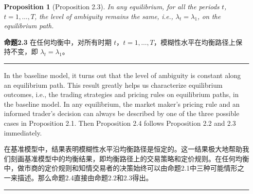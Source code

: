 \documentclass[12pt,a4paper]{article}
\newenvironment{original}{%
  \par\vspace{4pt}\noindent%
  \color{black}%
  \ignorespaces
}{%
  \par\vspace{2pt}%
}
\newenvironment{translation}{%
  \par\vspace{2pt}\noindent%
  \color{transblue}%
  \ignorespaces
}{%
  \par\vspace{4pt}\hrule\vspace{6pt}%
}
\newtheorem{proposition}[theorem]{Proposition}
\begin{document}
\begin{proposition}[Proposition 2.3]
In any equilibrium, for all the periods $t$, $t = 1, \dots, T$, the level of ambiguity remains the same, i.e., $\lambda_t = \lambda_1$, on the equilibrium path.
\end{proposition}
\begin{translation}
\textbf{命题2.3} 在任何均衡中，对所有时期 $t$，$t = 1, \dots, T$，模糊性水平在均衡路径上保持不变，即 $\lambda_t = \lambda_1$。
\end{translation}

\begin{original}
In the baseline model, it turns out that the level of ambiguity is constant along an equilibrium path. This result greatly helps us characterize equilibrium outcomes, i.e., the trading strategies and pricing rules on equilibrium paths, in the baseline model. In any equilibrium, the market maker's pricing rule and an informed trader's decision can always be described by one of the three possible cases in Proposition 2.1. Then Proposition 2.4 follows Proposition 2.2 and 2.3 immediately.
\end{original}
\begin{translation}
在基准模型中，结果表明模糊性水平沿均衡路径是恒定的。这一结果极大地帮助我们刻画基准模型中的均衡结果，即均衡路径上的交易策略和定价规则。在任何均衡中，做市商的定价规则和知情交易者的决策始终可以由命题2.1中三种可能情形之一来描述。那么命题2.4直接由命题2.2和2.3得出。
\end{translation}
\end{document}
